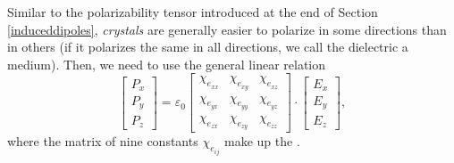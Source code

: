 Similar to the polarizability tensor introduced at the end of Section \ref{induceddipoles}, \textit{crystals} are generally easier to polarize in some directions than in others (if it polarizes the same in all directions, we call the dielectric a  medium). Then, we need to use the general linear relation
\[\begin{bmatrix}
P_x\\P_y\\P_z
\end{bmatrix}=\varepsilon_0\begin{bmatrix}
\chi_{e_{xx}} & \chi_{e_{xy}} & \chi_{e_{xz}}\\
\chi_{e_{yx}} & \chi_{e_{yy}} & \chi_{e_{yz}}\\
\chi_{e_{zx}} & \chi_{e_{zy}} & \chi_{e_{zz}}
\end{bmatrix}\cdot\begin{bmatrix}
E_x\\E_y\\E_z
\end{bmatrix},\]
where the matrix of nine constants $\chi_{e_{ij}}$ make up the .